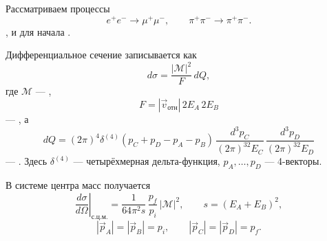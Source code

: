 \documentclass[../final.tex]{subfiles}
\begin{document}



Рассматриваем процессы
\begin{equation*}
    e^+e^-\longrightarrow\mu^+\mu^-,
    \qquad
    \pi^+\pi^-\longrightarrow\pi^+\pi^-.
\end{equation*}
,
и для начала .

Дифференциальное сечение записывается как
\begin{equation*}
    d\sigma=\frac{|\mathcal M|^2}{F}\,dQ,
\end{equation*}
где $\mathcal M$ --- ,
\begin{equation*}
    F=|\vec v_{\text{отн}}|\,2E_A\,2E_B
\end{equation*}
--- , а
\begin{equation*}
    dQ=(2\pi)^4\delta^{(4)}(p_C+p_D-p_A-p_B)\,
    \frac{d^3p_C}{(2\pi)^32E_C}\,
    \frac{d^3p_D}{(2\pi)^32E_D}
\end{equation*}
--- . Здесь $\delta^{(4)}$ ---
четырёхмерная дельта-функция, $p_A,\dots,p_D$ --- 4-векторы.

В системе центра масс получается
\begin{equation*}
    \left.\frac{d\sigma}{d\Omega}\right|_{\text{с.ц.м.}}
    =\frac{1}{64\pi^2s}\,\frac{p_f}{p_i}\,|\mathcal M|^2,
    \qquad
    s=(E_A+E_B)^2,
\end{equation*}
\begin{equation*}
    |\vec p_A|=|\vec p_B|=p_i,
    \qquad
    |\vec p_C|=|\vec p_D|=p_f.
\end{equation*}

\label{task:cm_cross_section_sem6}
\end{document}
